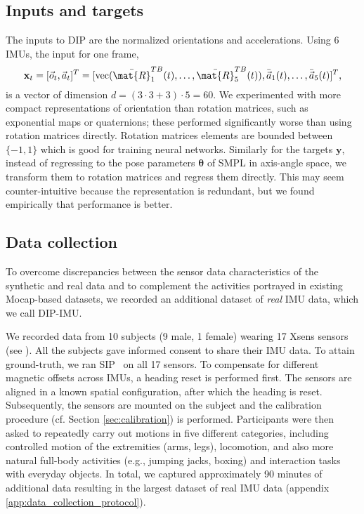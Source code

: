 \documentclass[acmtog]{acmart}
\newcommand{\pose}[0]{\boldsymbol{\theta}}\newcommand{\target}[0]{\mathbf{y}}\newcommand{\xin}[0]{\mathbf{x}}%
\begin{document}
\subsection{Inputs and targets}\label{sec:io}
The inputs to DIP are the normalized orientations and accelerations. Using 6 IMUs, the input for one frame, 
\begin{equation*}
\xin_t= [\vec{o}_t, \vec{a}_t]^T = [\mathrm{vec}(\bar{\mat{R}}^{TB}_1(t), \hdots, \bar{\mat{R}}^{TB}_5(t)),\bar{\vec{a}}_1(t),\hdots, \bar{\vec{a}}_5(t)]^T,
\end{equation*}
is a vector of dimension $d = {(3\cdot 3 + 3)}\cdot 5 =60$. 
We experimented with more compact representations of orientation than rotation matrices, such as exponential maps or quaternions; these performed significantly worse than using rotation matrices directly. Rotation matrices elements are bounded between $\{-1,1\}$ which is good for training neural networks. Similarly for the targets $\target$, instead of regressing to the pose parameters $\pose$ of SMPL in axis-angle space, we transform them to rotation matrices and regress them directly. This may seem counter-intuitive because the representation is redundant, but we found empirically that performance is better. 

\subsection{Data collection}\label{sec:data-collection}
To overcome discrepancies between the sensor data characteristics of the synthetic and real data and to complement the activities portrayed in existing Mocap-based datasets, we recorded an additional dataset of \emph{real} IMU data, which we call DIP-IMU. 

We recorded data from 10 subjects (9 male, 1 female) wearing 17 Xsens sensors (see ). All the subjects gave informed consent to share their IMU data. To attain ground-truth, we ran SIP~\cite{von2017sparse} on all 17 sensors. To compensate for different magnetic offsets across IMUs, a heading reset is performed first. The sensors are aligned in a known spatial configuration, after which the heading is reset. Subsequently, the sensors are mounted on the subject and the calibration procedure (cf. Section \ref{sec:calibration}) is performed. Participants were then asked to repeatedly carry out motions in five different categories, including controlled motion of the extremities (arms, legs), locomotion, and also more natural full-body activities (e.g., jumping jacks, boxing) and interaction tasks with everyday objects. In total, we captured approximately 90 minutes of additional data resulting in the largest dataset of real IMU data (appendix \ref{app:data_collection_protocol}).
\end{document}
